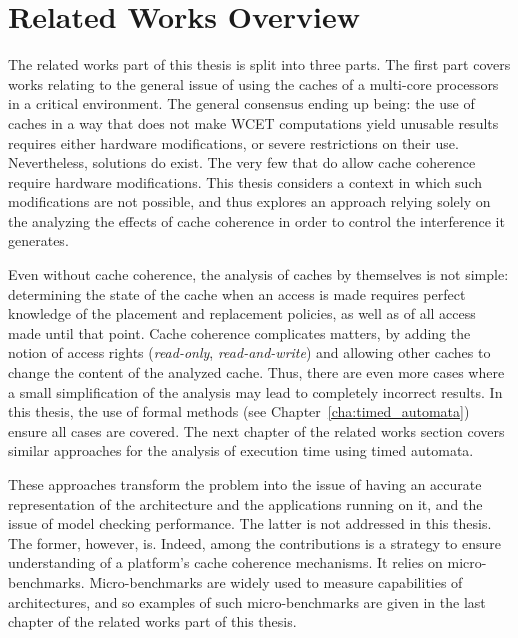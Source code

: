 \stopallthesefloats
\section{Related Works Overview}
The related works part of this thesis is split into three parts. The first part
covers works relating to the general issue of using the caches of a multi-core
processors in a critical environment. The general consensus ending up being:
the use of caches in a way that does not make WCET computations yield unusable
results requires either hardware modifications, or severe restrictions on their
use. Nevertheless, solutions do exist. The very few that do allow cache
coherence require hardware modifications. This thesis considers a context in
which such modifications are not possible, and thus explores an approach relying
solely on the analyzing the effects of cache coherence in order to control the
interference it generates.

Even without cache coherence, the analysis of caches by themselves is not
simple: determining the state of the cache when an access is made requires
perfect knowledge of the placement and replacement policies, as well as of all
access made until that point. Cache coherence complicates matters, by adding
the notion of access rights (\textit{read-only}, \textit{read-and-write}) and
allowing other caches to change the content of the analyzed cache. Thus, there
are even more cases where a small simplification of the analysis may lead to
completely incorrect results. In this thesis, the use of formal methods (see
Chapter~\ref{cha:timed_automata}) ensure all cases are covered. The next
chapter of the related works section covers similar approaches for the analysis
of execution time using timed automata.

These approaches transform the problem into the issue of having an accurate
representation of the architecture and the applications running on it, and the
issue of model checking performance. The latter is not addressed in this
thesis. The former, however, is. Indeed, among the contributions is a strategy
to ensure understanding of a platform's cache coherence mechanisms. It relies
on micro-benchmarks. Micro-benchmarks are widely used to measure capabilities
of architectures, and so examples of such micro-benchmarks are given in the
last chapter of the related works part of this thesis.
